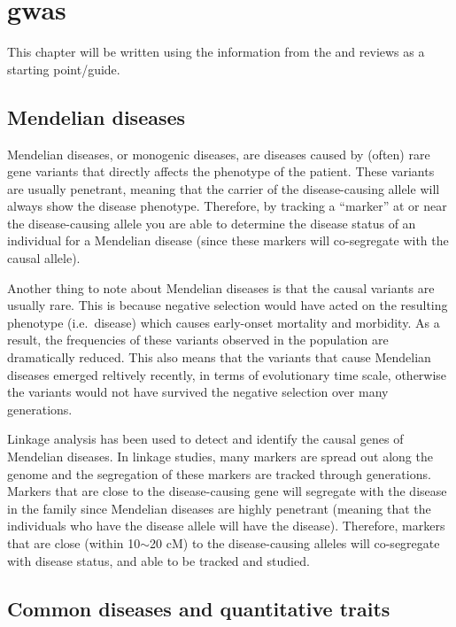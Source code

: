 \chapter{\Gls{gwas}}
\label{cha:gwas}

This chapter will be written using the information from the \citet{Hirschhorn2005} and \citet{McCarthy2008} reviews as a starting point/guide.

\section{Mendelian diseases}
\label{sec:mendelian_diseases}

Mendelian diseases, or monogenic diseases, are diseases caused by (often) rare gene variants that directly affects the phenotype of the patient.
These variants are usually penetrant, meaning that the carrier of the disease-causing allele will always show the disease phenotype.
Therefore, by tracking a ``marker'' at or near the disease-causing allele you are able to determine the disease status of an individual for a Mendelian disease (since these markers will co-segregate with the causal allele).

Another thing to note about Mendelian diseases is that the causal variants are usually rare.
This is because negative selection would have acted on the resulting phenotype (i.e.\ disease) which causes early-onset mortality and morbidity.
As a result, the frequencies of these variants observed in the population are dramatically reduced.
This also means that the variants that cause Mendelian diseases emerged reltively recently, in terms of evolutionary time scale, otherwise the variants would not have survived the negative selection over many generations.

Linkage analysis has been used to detect and identify the causal genes of Mendelian diseases.
In linkage studies, many markers are spread out along the genome and the segregation of these markers are tracked through generations.
Markers that are close to the disease-causing gene will segregate with the disease in the family since Mendelian diseases are highly penetrant (meaning that the individuals who have the disease allele will have the disease).
Therefore, markers that are close (within 10$\sim$20 cM) to  the disease-causing alleles will co-segregate with disease status, and able to be tracked and studied.

\section{Common diseases and quantitative traits}
\label{sec:common_diseases_and_quantitative_traits}

